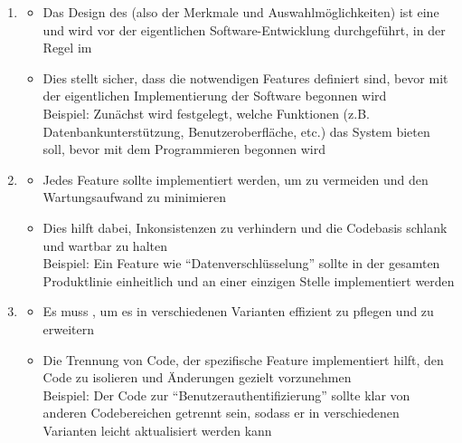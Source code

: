 \begin{infoBox}[title=Prinzipien von SPLE]
    \begin{enumerate}
        \item {}
        \begin{itemize}
            \item Das Design des  (also der Merkmale und Auswahlmöglichkeiten) ist eine  und wird vor der eigentlichen Software-Entwicklung durchgeführt, in der Regel im 
            \item Dies stellt sicher, dass die notwendigen Features definiert sind, bevor mit der eigentlichen Implementierung der Software begonnen wird\\
            Beispiel: Zunächst wird festgelegt, welche Funktionen (z.B. Datenbankunterstützung, Benutzeroberfläche, etc.) das System bieten soll, bevor mit dem Programmieren begonnen wird
        \end{itemize}
        \item {}
        \begin{itemize}
            \item Jedes Feature sollte  implementiert werden, um  zu vermeiden und den Wartungsaufwand zu minimieren
            \item Dies hilft dabei, Inkonsistenzen zu verhindern und die Codebasis schlank und wartbar zu halten\\
            Beispiel: Ein Feature wie \enquote{Datenverschlüsselung} sollte in der gesamten Produktlinie einheitlich und an einer einzigen Stelle implementiert werden
        \end{itemize}
        \item {}
        \begin{itemize}
            \item Es muss , um es in verschiedenen Varianten effizient zu pflegen und zu erweitern
            \item Die Trennung von Code, der spezifische Feature implementiert hilft, den Code zu isolieren und Änderungen gezielt vorzunehmen\\
            Beispiel: Der Code zur \enquote{Benutzerauthentifizierung} sollte klar von anderen Codebereichen getrennt sein, sodass er in verschiedenen Varianten leicht aktualisiert werden kann
        \end{itemize}
    \end{enumerate}
\end{infoBox}
\clearpage
